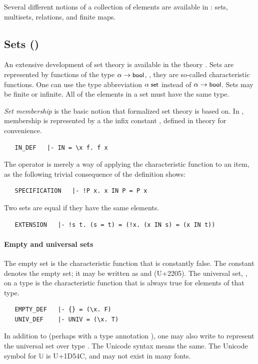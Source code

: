 {Several different notions of a collection of elements are available in
\HOL: sets, multisets, relations, and finite maps.

\subsection{Sets ()}
\label{sec:theory-of-sets}

An extensive development of set theory is available in the theory
. Sets are represented by functions of the type
$\alpha \to \mbox{\small{\textbf{\sf{bool}}}}$, \ie, they are so-called characteristic
functions.
%
%
One can use the type abbreviation $\alpha\; \mbox{\small{\textbf{\sf{set}}}}$
instead of $\alpha \to \mbox{\small{\textbf{\sf{bool}}}}$. Sets may be finite or
infinite. All of the elements in a set must have the same type.

\emph{Set membership} is the basic notion that formalized set theory
is based on. In \HOL, membership is represented by a the infix
constant , defined in theory  for
convenience.
\begin{hol}
\begin{verbatim}
   IN_DEF   |- IN = \x f. f x
\end{verbatim}
\end{hol}
The  operator is merely a way of applying the
characteristic function to an item, as the following trivial
consequence of the definition shows:
\begin{hol}
\begin{verbatim}
   SPECIFICATION   |- !P x. x IN P = P x
\end{verbatim}
\end{hol}
Two sets are equal if they have the same elements.
\begin{hol}
\begin{verbatim}
   EXTENSION   |- !s t. (s = t) = (!x. (x IN s) = (x IN t))
\end{verbatim}
\end{hol}

\paragraph{Empty and universal sets}
The empty set is the characteristic function that is constantly false. The constant  denotes the empty set; it may be written as \holtxt{\{\}} and \holtxt{$\emptyset$} (U+2205).
The universal set, , on a type is the characteristic function that is always true for elements of that type.
\begin{hol}
\begin{verbatim}
   EMPTY_DEF   |- {} = (\x. F)
   UNIV_DEF    |- UNIV = (\x. T)
\end{verbatim}
\end{hol}
In addition to  (perhaps with a type annotation ), one may also write  to represent the universal set over type .
The Unicode syntax  means the same.
The Unicode symbol for $\mathbb{U}$ is U+1D54C, and may not exist in many fonts.

}
